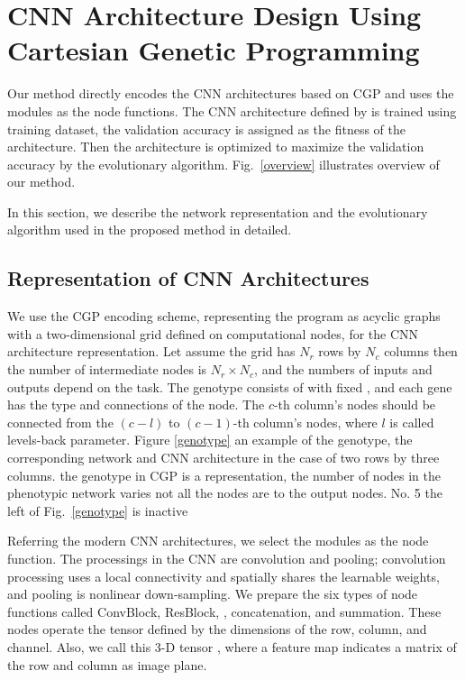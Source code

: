 \section{CNN Architecture Design Using Cartesian Genetic Programming}
Our method directly encodes the CNN architectures based on CGP \cite{harding_evolution_2008,miller_redundancy_2006,miller_cartesian_2000} and uses the  modules as the node functions.
The CNN architecture defined by  is trained using  training dataset,  the validation accuracy is assigned as the fitness of the architecture. Then\new{,} the architecture is optimized to maximize the validation accuracy by the evolutionary algorithm.
Fig.~\ref{overview} illustrates  overview of our method.

In this section, we describe the network representation and the evolutionary algorithm used in the proposed method in detailed.

\subsection{Representation of CNN Architectures}
We use the CGP encoding scheme, representing the program as  acyclic graphs with a two-dimensional grid defined on computational nodes, for the CNN architecture representation. Let  assume  the grid has $N_r$ rows by $N_c$ columns\new{;} then the number of intermediate nodes is $N_r \times N_c$, and the numbers of inputs and outputs depend on the task. The genotype consists of  with fixed , and each gene has   the type and connections of the node. The $c$-th column's nodes should be connected from the $(c-l)$ to $(c-1)$-th column's nodes, where $l$ is called  levels-back parameter. Figure \ref{genotype}  an example of the genotype, the corresponding network\new{,} and  CNN architecture in the case of two rows by three columns.  the genotype in CGP is a  representation, the number of nodes in the phenotypic network varies  not all  the nodes are  to the output nodes.  No. 5  the left  of Fig.~\ref{genotype} is  inactive 

Referring  the modern CNN architectures, we select the  modules as the node function.
The  processings in the CNN are convolution and pooling; convolution processing uses a local connectivity and spatially shares the learnable weights, and pooling is nonlinear down-sampling.
We prepare the six types of node functions called ConvBlock, ResBlock, , concatenation, and summation.
These nodes operate the  tensor defined by the dimensions of the row, column, and channel. Also, we call this 3-D tensor , where a feature map indicates a matrix of the row and column as  image plane.

